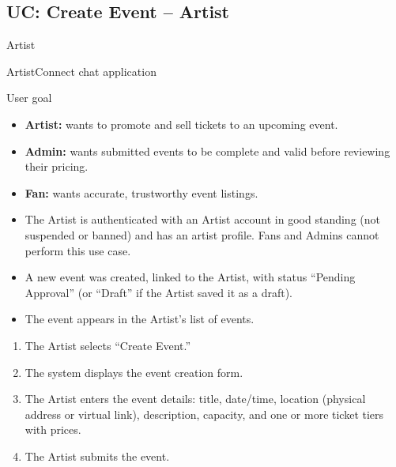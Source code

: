 \documentclass[11pt]{report}
\begin{document}
\subsection{UC: Create Event -- Artist}

\begin{description}[leftmargin=2.2cm, style=nextline]
  \item[Primary Actor] Artist
  \item[Scope] ArtistConnect chat application
  \item[Level] User goal
  \item[Stakeholders \& Interests]
    \begin{itemize}
      \item \textbf{Artist:} wants to promote and sell tickets to an upcoming event.
      \item \textbf{Admin:} wants submitted events to be complete and valid before reviewing their pricing.
      \item \textbf{Fan:} wants accurate, trustworthy event listings.
    \end{itemize}
  \item[Preconditions]
    \begin{itemize}
      \item The Artist is authenticated with an Artist account in good standing (not suspended or banned) and has an artist profile. Fans and Admins cannot perform this use case.
    \end{itemize}
  \item[Postconditions (Success Guarantee)]
    \begin{itemize}
      \item A new event was created, linked to the Artist, with status ``Pending Approval'' (or ``Draft'' if the Artist saved it as a draft).
      \item The event appears in the Artist's list of events.
    \end{itemize}
  \item[Main Success Scenario]
    \begin{enumerate}
      \item The Artist selects ``Create Event.''
      \item The system displays the event creation form.
      \item The Artist enters the event details: title, date/time, location (physical address or virtual link), description, capacity, and one or more ticket tiers with prices.
      \item The Artist submits the event.

\end{enumerate}
\end{description}
\end{document}

